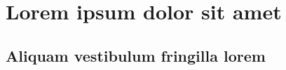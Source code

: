 \chapter{Lorem ipsum dolor sit amet}

\section{Aliquam vestibulum fringilla lorem}

\lipsum[1]

\lipsum[2-7]